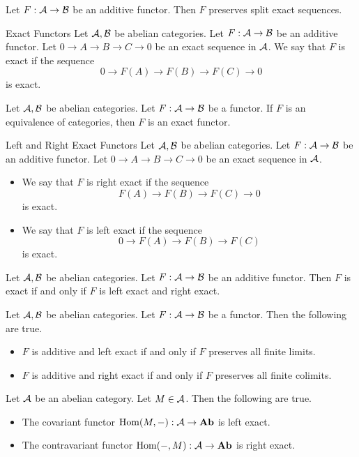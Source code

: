 \documentclass[a4paper]{article}
\begin{document}
\begin{prp}{}{} Let $F:\mathcal{A}\to\mathcal{B}$ be an additive functor. Then $F$ preserves split exact sequences. 
\end{prp}

\begin{defn}{Exact Functors}{} Let $\mathcal{A},\mathcal{B}$ be abelian categories. Let $F:\mathcal{A}\to\mathcal{B}$ be an additive functor. Let $0\to A\to B\to C\to 0$ be an exact sequence in $\mathcal{A}$. We say that $F$ is exact if the sequence $$0\to F(A)\to F(B)\to F(C)\to 0$$ is exact. 
\end{defn}

\begin{lmm}{}{} Let $\mathcal{A},\mathcal{B}$ be abelian categories. Let $F:\mathcal{A}\to\mathcal{B}$ be a functor. If $F$ is an equivalence of categories, then $F$ is an exact functor. 
\end{lmm}

\begin{defn}{Left and Right Exact Functors}{} Let $\mathcal{A},\mathcal{B}$ be abelian categories. Let $F:\mathcal{A}\to\mathcal{B}$ be an additive functor. Let $0\to A\to B\to C\to 0$ be an exact sequence in $\mathcal{A}$. 
\begin{itemize}
\item We say that $F$ is right exact if the sequence $$F(A)\to F(B)\to F(C)\to 0$$ is exact. 
\item We say that $F$ is left exact if the sequence $$0\to F(A)\to F(B)\to F(C)$$ is exact. 
\end{itemize}
\end{defn}

\begin{lmm} Let $\mathcal{A},\mathcal{B}$ be abelian categories. Let $F:\mathcal{A}\to\mathcal{B}$ be an additive functor. Then $F$ is exact if and only if $F$ is left exact and right exact. 
\end{lmm}

\begin{prp}{}{} Let $\mathcal{A},\mathcal{B}$ be abelian categories. Let $F:\mathcal{A}\to\mathcal{B}$ be a functor. Then the following are true. 
\begin{itemize}
\item $F$ is additive and left exact if and only if $F$ preserves all finite limits. 
\item $F$ is additive and right exact if and only if $F$ preserves all finite colimits. 
\end{itemize}
\end{prp}

\begin{prp}{}{} Let $\mathcal{A}$ be an abelian category. Let $M\in\mathcal{A}$. Then the following are true. 
\begin{itemize}
\item The covariant functor $\operatorname{Hom}(M,-):\mathcal{A}\to\bold{Ab}$ is left exact. 
\item The contravariant functor $\operatorname{Hom}(-,M):\mathcal{A}\to\bold{Ab}$ is right exact. 
\end{itemize}
\end{prp}
\end{document}

